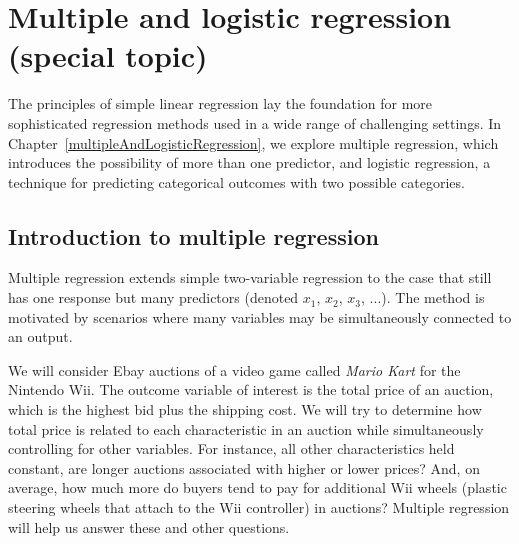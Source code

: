 \chapter{Multiple and logistic regression (special topic)}
\label{multipleRegressionAndANOVA}
\label{multipleAndLogisticRegression}


The principles of simple linear regression lay the foundation for more sophisticated regression methods used in a wide range of challenging settings. In Chapter~\ref{multipleAndLogisticRegression}, we explore multiple regression, which introduces the possibility of more than one predictor, and logistic regression, a technique for predicting categorical outcomes with two possible categories.

\section{Introduction to multiple regression}
\label{introductionToMultipleRegression}


Multiple regression extends simple two-variable regression to the case that still has one response but many predictors (denoted $x_1$, $x_2$, $x_3$, ...). The method is motivated by scenarios where many variables may be simultaneously connected to an output.


We will consider Ebay auctions of a video game called \emph{Mario Kart} for the Nintendo Wii. The outcome variable of interest is the total price of an auction, which is the highest bid plus the shipping cost. We will try to determine how total price is related to each characteristic in an auction while simultaneously controlling for other variables. For instance, all other characteristics held constant, are longer auctions associated with higher or lower prices? And, on average, how much more do buyers tend to pay for additional Wii wheels (plastic steering wheels that attach to the Wii controller) in auctions? Multiple regression will help us answer these and other questions.

